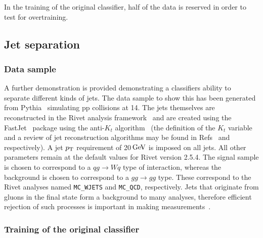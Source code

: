 \documentclass[final,5p,times,twocolumn]{elsarticle}
\def\to                 {\ensuremath{\rightarrow}\xspace}
\newcommand{\tev}{\ifthenelse{\boolean{inbibliography}}{\ensuremath{~T\kern -0.05em eV}\xspace}{\ensuremath{\mathrm{\,Te\kern -0.1em V}}}\xspace}
\newcommand{\gev}{\ensuremath{\mathrm{\,Ge\kern -0.1em V}}\xspace}
\def\pt         {\mbox{$p_{\rm T}$}\xspace}
\begin{document}
In the training of the original classifier, half of the data is
reserved in order to test for overtraining.


\subsection{Jet separation}
\label{sec:hepGPD}

\subsubsection{Data sample}

A further demonstration is provided demonstrating a classifiers ability to separate different
kinds of jets. The data sample to show this has been generated from Pythia~\cite{Sjostrand:2007gs}
simulating pp collisions at 14\tev.
The jets themselves are reconstructed in the Rivet analysis framework~\cite{Buckley:2010ar}
and are created using the FastJet~\cite{Cacciari:2011ma} package using the anti-$K_t$ algorithm~\cite{Salam:2007xv}
(the definition
of the $K_t$ variable and a review of jet reconstruction algorithms
may be found in Refs~\cite{kt} and \cite{Atkin:2015msa} respectively).
A jet \pt requirement of 20\gev is imposed on all jets.
All other parameters remain at the default values for Rivet version 2.5.4.
The signal sample is chosen to correspond to a $qg\to Wq$ type of interaction,
whereas the background is chosen to correspond to a $gg \to gg$ type. These correspond
to the Rivet analyses named {\tt MC\_WJETS} and {\tt MC\_QCD}, respectively.
Jets that originate from gluons in the final state form a background to many
analyses, therefore efficient rejection of such processes is important in making
measurements~\cite{Komiske:2016rsd}.

\subsubsection{Training of the original classifier}
\end{document}
